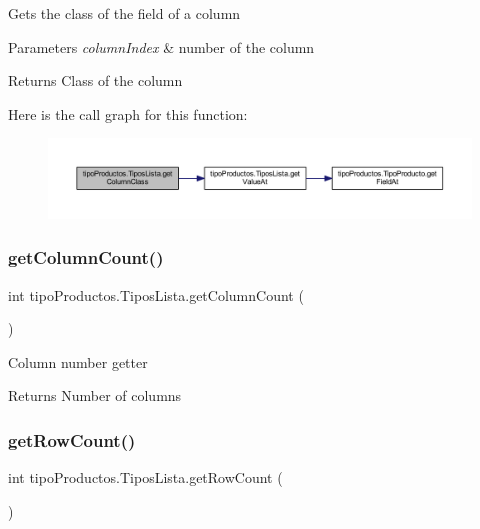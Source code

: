 Gets the class of the field of a column 
\begin{DoxyParams}{Parameters}
{\em column\+Index} & number of the column \\
\hline
\end{DoxyParams}
\begin{DoxyReturn}{Returns}
Class of the column 
\end{DoxyReturn}
Here is the call graph for this function\+:
\nopagebreak
\begin{figure}[H]
\begin{center}
\leavevmode
\includegraphics[width=350pt]{classtipo_productos_1_1_tipos_lista_a87b924c7d8f72e7615286c41d19c2589_cgraph}
\end{center}
\end{figure}
\mbox{\label{classtipo_productos_1_1_tipos_lista_ae09ef2d57d7c7989d4e0e99463294761}} 
\subsubsection{\texorpdfstring{get\+Column\+Count()}{getColumnCount()}}
{\footnotesize\ttfamily int tipo\+Productos.\+Tipos\+Lista.\+get\+Column\+Count (\begin{DoxyParamCaption}{ }\end{DoxyParamCaption})}

Column number getter \begin{DoxyReturn}{Returns}
Number of columns 
\end{DoxyReturn}
\mbox{\label{classtipo_productos_1_1_tipos_lista_a619180cf0e73dd687d83511c805b0a7d}} 
\subsubsection{\texorpdfstring{get\+Row\+Count()}{getRowCount()}}
{\footnotesize\ttfamily int tipo\+Productos.\+Tipos\+Lista.\+get\+Row\+Count (\begin{DoxyParamCaption}{ }\end{DoxyParamCaption})}


